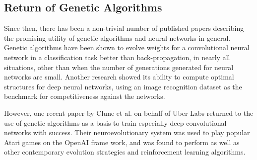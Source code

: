 \documentclass[12pt,a4paper]{article}
\begin{document}


    \subsection{Return of Genetic Algorithms}

        Since then, there has been a non-trivial number of published papers describing the promising utility of genetic algorithms and neural networks in general. Genetic algorithms have been shown to evolve weights for a convolutional neural network in a classification task better than back-propagation, in nearly all situations, other than when the number of generations generated for neural networks are small. \cite{perez_apply_nodate} Another research showed its ability to compute optimal structures for deep neural networks, using an image recognition dataset as the benchmark for competitiveness against the networks. \cite{xie_genetic_2017}
        

        However, one recent paper by Clune et al. on behalf of Uber Labs returned to the use of genetic algorithms as a basis to train especially deep convolutional networks with success. \cite{such_deep_2017} Their neuroevolutionary system was used to play popular Atari games on the OpenAI frame  work, and was found to perform as well as other contemporary evolution strategies and reinforcement learning algorithms. 
\end{document}
